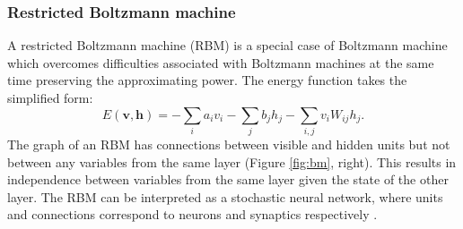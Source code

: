 \subsubsection{Restricted Boltzmann machine}
A restricted Boltzmann machine (RBM) is a special case of Boltzmann machine which overcomes difficulties associated with Boltzmann machines at the same time preserving the approximating power. The energy function takes the simplified form:
$$ E (\mathbf{v,h}) = - \sum_i a_i v_i - \sum_j b_j h_j - \sum_{i,j} v_i W_{ij}h_j.$$
The graph of an RBM has connections between visible and hidden units but not between any variables from the same layer (Figure \ref{fig:bm}, right). This results in independence between variables from the same layer given the state of the other layer. The RBM can be interpreted as a stochastic neural network, where units and connections correspond to neurons and synaptics respectively \cite{fischer2012introduction}.

